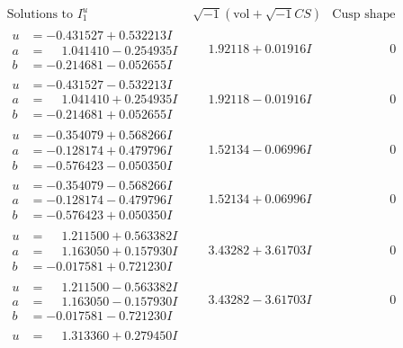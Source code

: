 \documentclass[1p]{elsarticle_modified}
\theoremstyle{definition}
\newcommand{\I}{\sqrt{-1}}
\begin{document}
$$\begin{array}{c|c|c}
\text{Solutions to }I^u_{1}& \I (\text{vol} + \sqrt{-1}CS) & \text{Cusp shape}\\
 \hline 
\begin{aligned}
u &= -0.431527 + 0.532213 I \\
a &= \phantom{-}1.041410 - 0.254935 I \\
b &= -0.214681 - 0.052655 I\end{aligned}
 & \phantom{-}1.92118 + 0.01916 I & \phantom{-0.000000 } 0 \\ \hline\begin{aligned}
u &= -0.431527 - 0.532213 I \\
a &= \phantom{-}1.041410 + 0.254935 I \\
b &= -0.214681 + 0.052655 I\end{aligned}
 & \phantom{-}1.92118 - 0.01916 I & \phantom{-0.000000 } 0 \\ \hline\begin{aligned}
u &= -0.354079 + 0.568266 I \\
a &= -0.128174 + 0.479796 I \\
b &= -0.576423 - 0.050350 I\end{aligned}
 & \phantom{-}1.52134 - 0.06996 I & \phantom{-0.000000 } 0 \\ \hline\begin{aligned}
u &= -0.354079 - 0.568266 I \\
a &= -0.128174 - 0.479796 I \\
b &= -0.576423 + 0.050350 I\end{aligned}
 & \phantom{-}1.52134 + 0.06996 I & \phantom{-0.000000 } 0 \\ \hline\begin{aligned}
u &= \phantom{-}1.211500 + 0.563382 I \\
a &= \phantom{-}1.163050 + 0.157930 I \\
b &= -0.017581 + 0.721230 I\end{aligned}
 & \phantom{-}3.43282 + 3.61703 I & \phantom{-0.000000 } 0 \\ \hline\begin{aligned}
u &= \phantom{-}1.211500 - 0.563382 I \\
a &= \phantom{-}1.163050 - 0.157930 I \\
b &= -0.017581 - 0.721230 I\end{aligned}
 & \phantom{-}3.43282 - 3.61703 I & \phantom{-0.000000 } 0 \\ \hline\begin{aligned}
u &= \phantom{-}1.313360 + 0.279450 I \\

\end{aligned}
\end{array}$$
\end{document}
